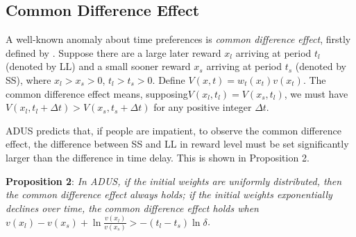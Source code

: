 \documentclass[
  12pt,
]{article}
\begin{document}
\hypertarget{common-difference-effect}{%
\subsection{Common Difference Effect}\label{common-difference-effect}}

A well-known anomaly about time preferences is \emph{common difference
effect}, firstly defined by \citet{loewenstein_anomalies_1992}. Suppose
there are a large later reward \(x_l\) arriving at period \(t_l\)
(denoted by LL) and a small sooner reward \(x_s\) arriving at period
\(t_s\) (denoted by SS), where \(x_l>x_s>0\), \(t_l>t_s>0\). Define
\(V(x,t)=w_t(x_t)v(x_t)\). The common difference effect means,
supposing\(V(x_l,t_l)=V(x_s,t_l)\), we must have
\(V(x_l,t_l+\Delta t)>V(x_s,t_s+\Delta t)\) for any positive integer
\(\Delta t\).

ADUS predicts that, if people are impatient, to observe the common
difference effect, the difference between SS and LL in reward level must
be set significantly larger than the difference in time delay. This is
shown in Proposition 2.

\textbf{Proposition 2}: \emph{In ADUS, if the initial weights are
uniformly distributed, then the common difference effect always holds;
if the initial weights exponentially declines over time, the common
difference effect holds when}
\(v(x_l)-v(x_s)+\ln\frac{v(x_l)}{v(x_s)}>-(t_l-t_s)\ln\delta\)\emph{.}
\end{document}
